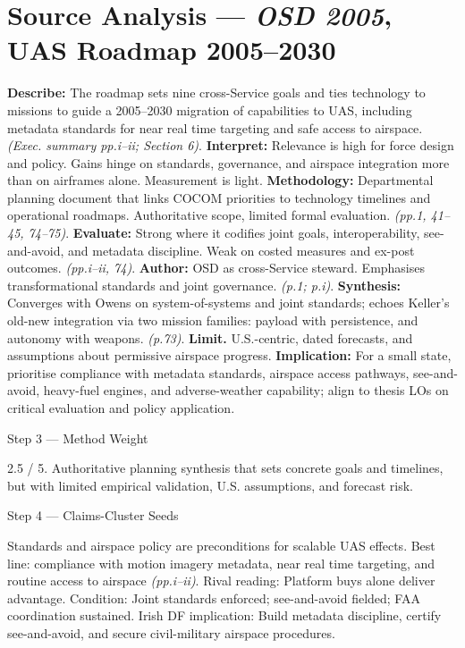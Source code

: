 \section*{Source Analysis — \textit{OSD 2005}, UAS Roadmap 2005–2030}
\textbf{Describe:} The roadmap sets nine cross-Service goals and ties technology to missions to guide a 2005–2030 migration of capabilities to UAS, including metadata standards for near real time targeting and safe access to airspace. \emph{(Exec. summary pp.i–ii; Section 6)}.
\textbf{Interpret:} Relevance is high for force design and policy. Gains hinge on standards, governance, and airspace integration more than on airframes alone. Measurement is light.
\textbf{Methodology:} Departmental planning document that links COCOM priorities to technology timelines and operational roadmaps. Authoritative scope, limited formal evaluation. \emph{(pp.1, 41–45, 74–75)}.
\textbf{Evaluate:} Strong where it codifies joint goals, interoperability, see-and-avoid, and metadata discipline. Weak on costed measures and ex-post outcomes. \emph{(pp.i–ii, 74)}.
\textbf{Author:} OSD as cross-Service steward. Emphasises transformational standards and joint governance. \emph{(p.1; p.i)}.
\textbf{Synthesis:} Converges with Owens on system-of-systems and joint standards; echoes Keller’s old-new integration via two mission families: payload with persistence, and autonomy with weapons. \emph{(p.73)}.
\textbf{Limit.} U.S.-centric, dated forecasts, and assumptions about permissive airspace progress. \textbf{Implication:} For a small state, prioritise compliance with metadata standards, airspace access pathways, see-and-avoid, heavy-fuel engines, and adverse-weather capability; align to thesis LOs on critical evaluation and policy application.

Step 3 — Method Weight

2.5 / 5. Authoritative planning synthesis that sets concrete goals and timelines, but with limited empirical validation, U.S. assumptions, and forecast risk.

Step 4 — Claims-Cluster Seeds

Standards and airspace policy are preconditions for scalable UAS effects.
Best line: compliance with motion imagery metadata, near real time targeting, and routine access to airspace \emph{(pp.i–ii)}.
Rival reading: Platform buys alone deliver advantage.
Condition: Joint standards enforced; see-and-avoid fielded; FAA coordination sustained.
Irish DF implication: Build metadata discipline, certify see-and-avoid, and secure civil-military airspace procedures.

